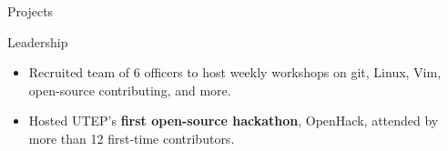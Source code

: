 \documentclass{resume} %
\begin{document}
\begin{workSection}{Projects}
\end{workSection}

\begin{workSection}{Leadership}
    
    \customItem[
    	title=President \& Founder - \href{https://www.instagram.com/foss.utep/}{\textbf{Free and Open-Source Software Club at UTEP} \faExternalLink},
    	duration=December 2023 - Present
    ]
    \begin{itemize}
    	\vspace{-0.5em}
    	\itemsep -6pt {}
    	\item Recruited team of 6 officers to host weekly workshops on git, Linux, Vim, open-source contributing, and more.
		\item Hosted UTEP's \textbf{first open-source hackathon}, OpenHack, attended by more than 12 first-time contributors.
    \end{itemize}


\end{workSection}
\end{document}
